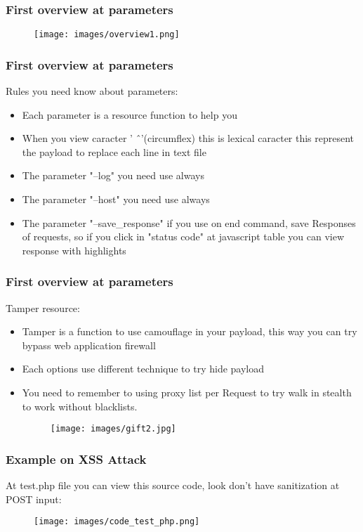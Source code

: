 \documentclass[serif,mathserif]{beamer}
\begin{document}
\begin{frame}
  \frametitle{First overview at parameters}
  \begin{figure}[t]
    \centering
    \texttt{[image: images/overview1.png]}
  \end{figure}
\end{frame}

\begin{frame}
  \frametitle{First overview at parameters}
  Rules you need know about parameters:
  \begin{itemize}
  \item Each parameter is a resource function to help you
  \item When you view caracter  ' \^\ '(circumflex)  this is lexical caracter this represent the payload to replace each line in text file 
  \item The parameter "--log" you need use always 
  \item The parameter "--host" you need use always
  \item The parameter "--save\_response" if you use on end command, save Responses of requests, so if you click in "status code" at javascript table you can view response with highlights  
  \end{itemize}
\end{frame}

\begin{frame}
  \frametitle{First overview at parameters}
  Tamper resource:
  \begin{itemize}
  \item Tamper is a function to use camouflage in your payload, this way you can try bypass web application firewall
  \item Each options use different technique to try hide payload 
  \item You need to remember to using proxy list per Request to try walk in stealth to work without blacklists.  
  \begin{figure}[t]
    \centering
    \texttt{[image: images/gift2.jpg]}
  \end{figure}
 \end{itemize}
\end{frame}


\begin{frame}
  \frametitle{Example on XSS Attack}
  At test.php file you can view this source code, look don't have sanitization at POST input:
  \begin{itemize}
  \begin{figure}[t]
    \centering
    \texttt{[image: images/code\_test\_php.png]}
  \end{figure}
 \end{itemize}
\end{frame}
\end{document}
